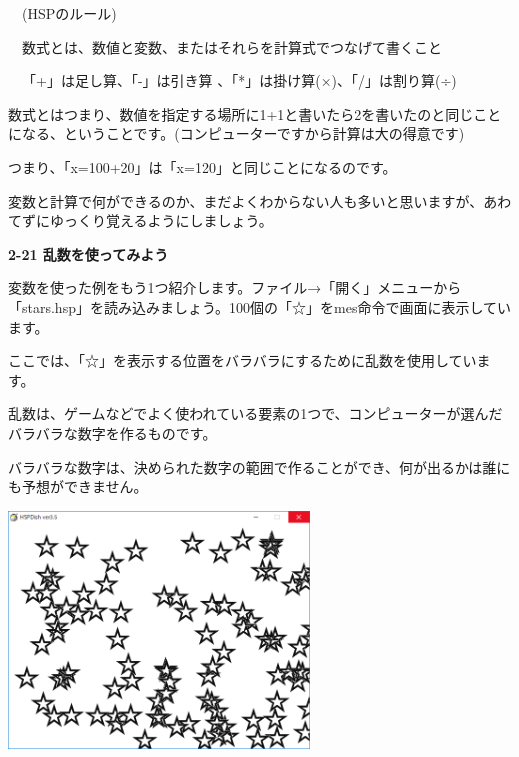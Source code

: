 \documentclass[a4paper,dvipdfmx]{jarticle}
\begin{document}
\bigskip


\bigskip


\bigskip


\bigskip


\bigskip


\bigskip


\bigskip


\bigskip


\bigskip


\bigskip


\bigskip


\bigskip


\bigskip


\bigskip

\ \ (HSPのルール)


\bigskip

\ \ 数式とは、数値と変数、またはそれらを計算式でつなげて書くこと

\ \ 「+」は足し算、「-」は引き算
、「*」は掛け算(×)、「/」は割り算(÷) 


\bigskip

数式とはつまり、数値を指定する場所に1+1と書いたら2を書いたのと同じことになる、ということです。(コンピューターですから計算は大の得意です)

つまり、「x=100+20」は「x=120」と同じことになるのです。

変数と計算で何ができるのか、まだよくわからない人も多いと思いますが、あわてずにゆっくり覚えるようにしましょう。


\bigskip


\bigskip

{\bfseries
2-21 乱数を使ってみよう}


\bigskip

変数を使った例をもう1つ紹介します。ファイル→「開く」メニューから「stars.hsp」を読み込みましょう。100個の「☆」をmes命令で画面に表示しています。

ここでは、「☆」を表示する位置をバラバラにするために乱数を使用しています。

乱数は、ゲームなどでよく使われている要素の1つで、コンピューターが選んだバラバラな数字を作るものです。

バラバラな数字は、決められた数字の範囲で作ることができ、何が出るかは誰にも予想ができません。


\bigskip



\begin{center}
\includegraphics[width=7.99cm,height=6.297cm]{text02-img/text02-img047.png}

\end{center}
\end{document}

